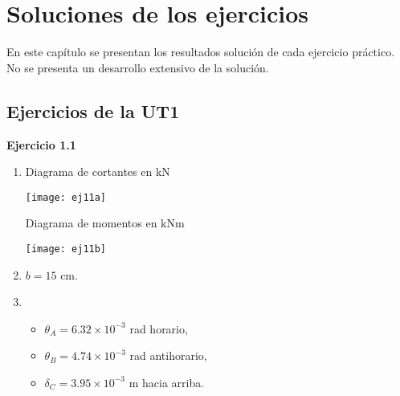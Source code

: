 %
%
%

\chapter{Soluciones de los ejercicios}

En este capítulo se presentan los resultados solución de cada ejercicio práctico. No se presenta un desarrollo extensivo de la solución.

\section{Ejercicios de la UT1}

\textbf{Ejercicio 1.1}\\
\begin{enumerate}[label=\alph*)]
\item Diagrama de cortantes en kN

\begin{center}
	\texttt{[image: ej11a]}
\end{center}

Diagrama de momentos en kNm

\begin{center}
	\texttt{[image: ej11b]}
\end{center}

\item  $b = 15$ cm.
\item
\begin{itemize}
	\item $\theta_A = 6.32 \times 10^{-3}$ rad  horario,
	\item $\theta_B = 4.74 \times 10^{-3}$ rad antihorario,
	\item $\delta_C = 3.95 \times 10^{-3}$ m hacia arriba.
\end{itemize}
\end{enumerate}



